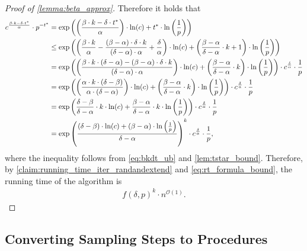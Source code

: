 \documentclass[letterpaper,11pt]{article}
\newcommand{\1}[1]{\mathds{1}\left[#1\right]}
\newcommand{\Oh}{\mathcal{O}}
\begin{document}
\begin{proof}[Proof of \cref{lemma:beta_approx}]
	Therefore it holds that
	\begin{align}
		c^{\frac{\beta \cdot k - \delta \cdot t^*}{\alpha}} \cdot p^{-t^*} &= \exp\left( \left( \frac{\beta \cdot k - \delta \cdot t^*}{\alpha} \right)  \cdot \ln(c) + t^* \cdot \ln\left( \frac{1}{p} \right)  \right) \notag \\
		&\leq \exp\left( \left( \frac{\beta \cdot k}{\alpha} - \frac{(\beta - \alpha) \cdot \delta \cdot k}{(\delta - \alpha) \cdot \alpha}  + \frac{\delta}{\alpha}\right)  \cdot \ln(c) + \left( \frac{\beta - \alpha}{\delta - \alpha}  \cdot k + 1 \right)  \cdot \ln\left( \frac{1}{p} \right) \right)  \notag \\
		&= \exp\left( \left(   \frac{\beta \cdot k \cdot (\delta - \alpha) - (\beta - \alpha) \cdot \delta \cdot k}{(\delta - \alpha) \cdot \alpha} \right)  \cdot \ln(c) + \left( \frac{\beta - \alpha}{\delta - \alpha} \cdot k \right)  \cdot \ln\left( \frac{1}{p} \right)  \right) \cdot c^{\frac{\delta}{\alpha}} \cdot \frac{1}{p}\notag \\		
		&= \exp\left( \left(   \frac{\alpha \cdot k \cdot (\delta - \beta)}{\alpha \cdot (\delta - \alpha)}  \right)  \cdot \ln(c) + \left( \frac{\beta - \alpha}{\delta - \alpha} \cdot k \right)  \cdot \ln\left( \frac{1}{p} \right)  \right)\cdot c^{\frac{\delta}{\alpha}} \cdot \frac{1}{p}\notag \\				
								  &= \exp\left( \frac{\delta - \beta}{\delta - \alpha} \cdot k\cdot \ln(c) + \frac{\beta - \alpha}{\delta - \alpha}  \cdot k \cdot \ln\left( \frac{1}{p} \right)  \right)\cdot c^{\frac{\delta}{\alpha}} \cdot \frac{1}{p}\notag \\
								  &= \exp\left( \frac{(\delta - \beta) \cdot \ln(c) + (\beta - \alpha) \cdot \ln\left( \frac{1}{p} \right) }{\delta - \alpha} \right)^{k} \cdot c^{\frac{\delta}{\alpha}} \cdot \frac{1}{p},\label{eq:rt_formula_bound}
	\end{align}
	where the inequality follows from \eqref{eq:bkdt_ub} and \cref{lem:tstar_bound}.
	Therefore, by \cref{claim:running_time_iter_randandextend} and \eqref{eq:rt_formula_bound}, the running time of the algorithm is
	\begin{align*}
		f(\delta, p)^{k} \cdot n^{\Oh(1)}.
	\end{align*}
\end{proof}

 
\subsection{Converting Sampling Steps to Procedures}
\label{sec:sampling_to_proc}
\end{document}
